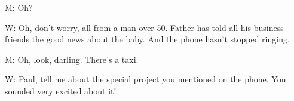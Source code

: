 \documentclass[12pt]{article}
\begin{document}
M: Oh?
\vspace{0.00mm}

\vspace{0.00mm}
\setlength{\parindent}{0.00mm}
\setlength{\leftskip}{-6.23mm}
\setlength{\rightskip}{0.00mm}


\vspace{0.00mm}

\vspace{0.00mm}
\setlength{\parindent}{0.00mm}
\setlength{\leftskip}{-6.23mm}
\setlength{\rightskip}{0.00mm}

W: Oh, don't worry, all from a man over 50. Father has told all his business friends the good news about the baby. And the phone hasn't stopped ringing.
\vspace{0.00mm}

\vspace{0.00mm}
\setlength{\parindent}{0.00mm}
\setlength{\leftskip}{-6.23mm}
\setlength{\rightskip}{0.00mm}


\vspace{0.00mm}

\vspace{0.00mm}
\setlength{\parindent}{0.00mm}
\setlength{\leftskip}{-6.23mm}
\setlength{\rightskip}{0.00mm}

M: Oh, look, darling. There's a taxi.
\vspace{0.00mm}

\vspace{0.00mm}
\setlength{\parindent}{0.00mm}
\setlength{\leftskip}{-6.23mm}
\setlength{\rightskip}{0.00mm}


\vspace{0.00mm}

\vspace{0.00mm}
\setlength{\parindent}{0.00mm}
\setlength{\leftskip}{-6.23mm}
\setlength{\rightskip}{0.00mm}

W: Paul, tell me about the special project you mentioned on the phone. You sounded very excited about it!
\vspace{0.00mm}

\vspace{0.00mm}
\setlength{\parindent}{0.00mm}
\setlength{\leftskip}{-6.23mm}
\setlength{\rightskip}{0.00mm}


\vspace{0.00mm}

\vspace{0.00mm}
\setlength{\parindent}{0.00mm}
\setlength{\leftskip}{-6.23mm}
\setlength{\rightskip}{0.00mm}
\end{document}
